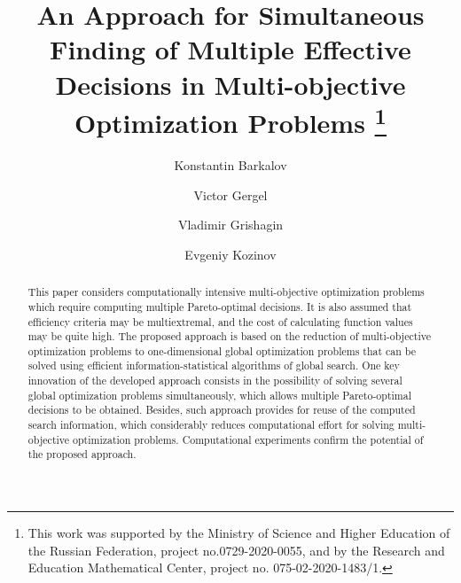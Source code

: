 \documentclass[runningheads]{llncs}
\begin{document}
%
\title{An Approach for Simultaneous Finding of Multiple Effective Decisions in Multi-objective Optimization Problems
\thanks{This work was supported by the Ministry of Science and Higher Education of the Russian Federation, project no.0729-2020-0055, and by the Research and Education Mathematical Center, project no. 075-02-2020-1483/1.}}
%
%
\author{Konstantin Barkalov \and
Victor Gergel \and
Vladimir Grishagin \and
Evgeniy Kozinov 
}
%
%
%
\maketitle              %
%
\begin{abstract}
This paper considers computationally intensive multi-objective optimization problems which require computing multiple Pareto-optimal decisions. It is also assumed that efficiency criteria may be multiextremal, and the cost of calculating function values may be quite high. The proposed approach is based on the reduction of multi-objective optimization problems to one-dimensional global optimization problems that can be solved using efficient information-statistical algorithms of global search. One key innovation of the developed approach consists in the possibility of solving several global optimization problems simultaneously, which allows multiple Pareto-optimal decisions to be obtained. Besides, such approach provides for reuse of the computed search information, which considerably reduces computational effort for solving multi-objective optimization problems. Computational experiments confirm the potential of the proposed approach.

\end{abstract}
%
%
%
\end{document}
